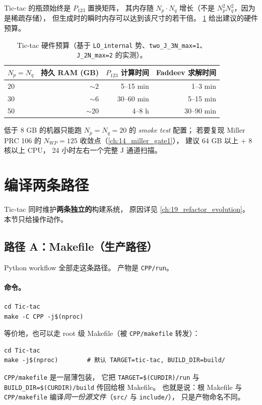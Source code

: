 Tic-tac 的瓶颈始终是 $P_{123}$ 置换矩阵，
其内存随 $N_p \cdot N_q$ 增长（不是 $N_p^2 N_q^2$，因为是稀疏存储），
但生成时的瞬时内存可以达到该尺寸的若干倍。
\cref{tab:ch20-hw} 给出建议的硬件预算。

\begin{table}[ht]
\centering
\small
\caption{Tic-tac 硬件预算（基于 \texttt{LO\_internal} 势、\texttt{two\_J\_3N\_max=1}、\texttt{J\_2N\_max=2} 的实测）。}
\label{tab:ch20-hw}
\begin{tabular}{@{}lrrr@{}}
\toprule
$N_p = N_q$ & 持久 RAM (GB) & $P_{123}$ 计算时间 & Faddeev 求解时间 \\
\midrule
20  & $\sim 2$    & 5--15 min       & 1--3 min  \\
30  & $\sim 6$    & 30--60 min      & 5--15 min \\
50  & $\sim 20$   & 4--8 h          & 30--90 min \\
\bottomrule
\end{tabular}
\end{table}

低于 8 GB 的机器只能跑 $N_p=N_q=20$ 的 \emph{smoke test} 配置；
若要复现 Miller PRC 106 的 $N_{WP}=125$ 收敛点（\cref{ch:14_miller_gate1}），
建议 64 GB 以上 + 8 核以上 CPU，
24 小时左右一个完整 J 通道扫描。

\section{编译两条路径}
\label{sec:ch20-build}

Tic-tac 同时维护\textbf{两条独立的}构建系统，
原因详见 \cref{ch:19_refactor_evolution}。
本节只给操作动作。

\subsection{路径 A：Makefile（生产路径）}
\label{sec:ch20-build-make}

Python workflow 全部走这条路径。
产物是 \texttt{CPP/run}。

\paragraph{命令。}
\begin{lstlisting}[style=config,caption={从仓库根编译 \texttt{CPP/run}。}]
cd Tic-tac
make -C CPP -j$(nproc)
\end{lstlisting}
等价地，也可以走 root 级 Makefile（被 \texttt{CPP/makefile} 转发）：
\begin{lstlisting}[style=config]
cd Tic-tac
make -j$(nproc)        # 默认 TARGET=tic-tac, BUILD_DIR=build/
\end{lstlisting}
\texttt{CPP/makefile} 是一层薄包装，
它把 \texttt{TARGET=\$(CURDIR)/run} 与 \texttt{BUILD\_DIR=\$(CURDIR)/build}
传回给根 Makefile。
也就是说：根 Makefile 与 \texttt{CPP/makefile} 编译\emph{同一份源文件}（\texttt{src/} 与 \texttt{include/}），
只是产物命名不同。

